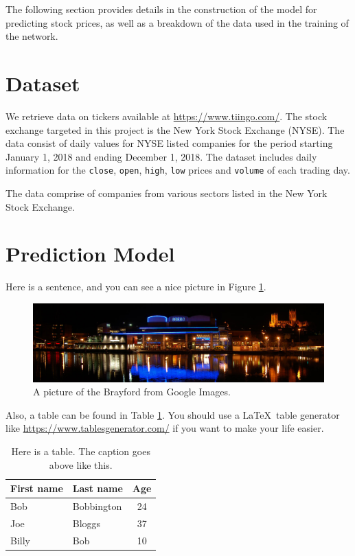 The following section provides details in the construction of the model for predicting stock prices, as well as a breakdown of the data used in the training of the network.

\section{Dataset}
We retrieve data on tickers available at \url{https://www.tiingo.com/}. The stock exchange targeted in this project is the New York Stock Exchange (NYSE). The data consist of daily values for NYSE listed companies for the period starting January 1, 2018 and ending December 1, 2018. The dataset includes daily information for the \texttt{close}, \texttt{open}, \texttt{high}, \texttt{low} prices and \texttt{volume} of each trading day.

The data comprise of companies from various sectors listed in the New York Stock Exchange. 

\section{Prediction Model}

Here is a sentence, and you can see a nice picture in Figure \ref{fig:brayford}.

\begin{figure}[ht]
    \centering
    \includegraphics[width=\textwidth]{figures/brayford.jpg}
    \caption{A picture of the Brayford from Google Images.}
    \label{fig:brayford}
\end{figure}

Also, a table can be found in Table \ref{tbl:example-table}. You should use a \LaTeX~table generator like \url{https://www.tablesgenerator.com/} if you want to make your life easier.

\begin{table}[ht]
    \caption{Here is a table. The caption goes above like this.}
    \centering
    \begin{tabular}{l|l|c}
        First name & Last name & Age \\
        \hline\hline
        Bob & Bobbington & 24 \\
        Joe & Bloggs & 37 \\
        Billy & Bob & 10 \\

    \end{tabular}
    \label{tbl:example-table}
\end{table}